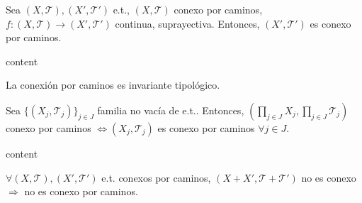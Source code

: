 \begin{prop}
  Sea $( X, \mathcal{T} ), ( X', \mathcal{T}' )$ e.t., $( X, \mathcal{T} )$ conexo por caminos, $f : ( X, \mathcal{T} ) \to ( X', \mathcal{T}' )$ continua, suprayectiva. Entonces, $( X', \mathcal{T}' )$ es conexo por caminos.
\end{prop}

\begin{dem}
  content
\end{dem}

\begin{cor}
  La conexión por caminos es invariante tipológico.
\end{cor}

\begin{prop}
  Sea $\{ ( X_{j}, \mathcal{T}_{j} ) \}_{j \in J}$ familia no vacía de e.t.. Entonces, $( \prod_{j \in J} X_{j}, \prod_{j \in J} \mathcal{T}_{j} )$ conexo por caminos $\Leftrightarrow ( X_{j}, \mathcal{T}_{j} )$ es conexo por caminos $\forall j \in J$.
\end{prop}

\begin{dem}
  content
\end{dem}

\begin{obs}
  $\forall ( X, \mathcal{T} ), ( X', \mathcal{T}' )$ e.t. conexos por caminos, $( X + X', \mathcal{T} + \mathcal{T}' )$ no es conexo $\Rightarrow$ no es conexo por caminos.
\end{obs}
